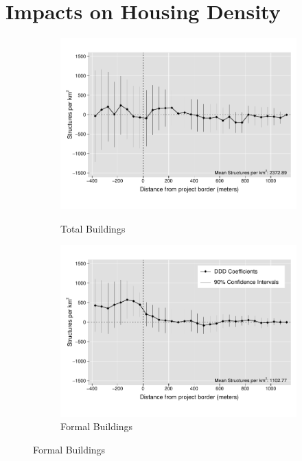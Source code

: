 \documentclass[12pt]{article}
\begin{document}
\section{Impacts on Housing Density}

\begin{figure}[t!]
        \centering
        \begin{subfigure}[b]{0.49\textwidth}
            \centering
            \caption[]{Total Buildings}  
            \vspace{-2mm}
            \includegraphics[width=\textwidth,trim={0cm .8cm 0cm .6cm}, clip=true]{figures/distplotDDD_bblu_total_buildings_admin}
            \label{fig:DDDtotal}
        \end{subfigure}
        \hfill
        \begin{subfigure}[b]{0.49\textwidth}  
            \centering 
            \caption[]{Formal Buildings}
            \vspace{-2mm}
            \includegraphics[width=\textwidth,trim={0cm .8cm 0cm .6cm}, clip=true]{figures/distplotDDD_bblu_for_admin}     

\end{subfigure}
\end{figure}
\end{document}
